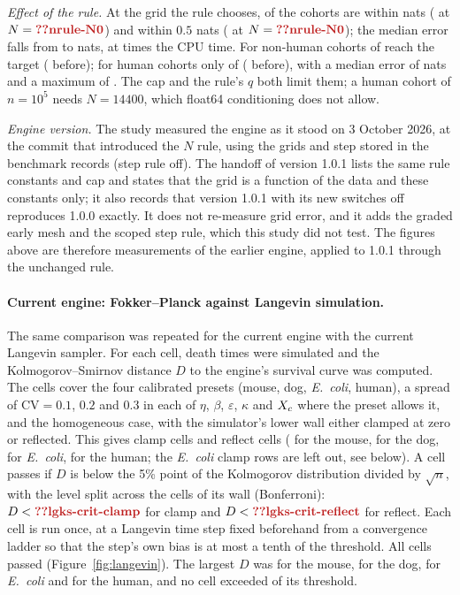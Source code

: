 \emph{Effect of the rule.} At the grid the rule chooses,  of the  cohorts are within 
nats ( at $N=\C{nrule-N0}$) and  within $0.5$ nats ( at
$N=\C{nrule-N0}$); the median error falls from  to  nats, at  times the CPU time. For non-human cohorts  of
 reach the target ( before); for human cohorts only  of 
( before), with a median error of  nats and a maximum of . The cap and the rule's
$q$ both limit them; a human cohort of $n=10^{5}$ needs $N=14400$, which float64 conditioning does not allow.

\emph{Engine version.} The study measured the engine as it stood on 3 October 2026, at the commit that introduced the $N$ rule,
using the grids and step stored in the benchmark records (step rule off). The handoff of version 1.0.1 lists the same rule
constants and cap and states that the grid is a function of the data and these constants only; it also records that version 1.0.1 with its
new switches off reproduces 1.0.0 exactly. It does not re-measure grid error, and it adds the graded early mesh and the scoped step rule, which this study
did not test. The figures above are therefore measurements of the earlier engine, applied to 1.0.1 through the unchanged rule.

\paragraph{Current engine: Fokker--Planck against Langevin simulation.} The same comparison was repeated for the current
engine with the current Langevin sampler. For each cell,  death times were simulated and the Kolmogorov--Smirnov
distance $D$ to the engine's survival curve was computed. The cells cover the four calibrated presets (mouse, dog,
\emph{E.~coli}, human), a spread of $\mathrm{CV}=0.1$, $0.2$ and $0.3$ in each of $\eta$, $\beta$, $\varepsilon$, $\kappa$ and $X_c$ where the
preset allows it, and the homogeneous case, with the simulator's lower wall either clamped at zero or reflected. This gives
 clamp cells and  reflect cells ( for the mouse, 
for the dog,  for \emph{E.~coli},  for the human; the \emph{E.~coli} clamp rows are
left out, see below). A cell passes if $D$ is below the 5\% point of the Kolmogorov distribution divided by $\sqrt n$, with
the level split across the cells of its wall (Bonferroni): $D<\C{lgks-crit-clamp}$ for clamp and $D<\C{lgks-crit-reflect}$ for
reflect. Each cell is run once, at a Langevin time step fixed beforehand from a convergence ladder so that the step's own
bias is at most a tenth of the threshold. All  cells passed (Figure~\ref{fig:langevin}). The largest $D$ was
 for the mouse,  for the dog,  for \emph{E.~coli} and  for
the human, and no cell exceeded  of its threshold.

